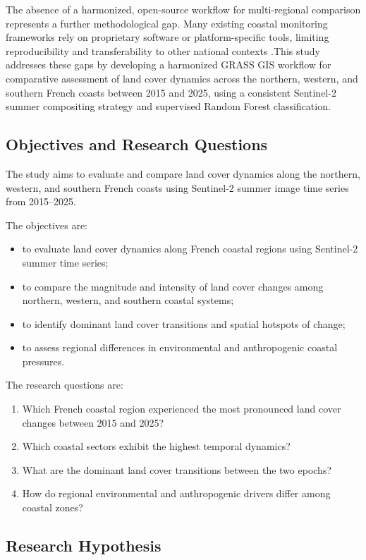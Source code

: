 \documentclass[remotesensing,article,submit,pdftex,moreauthors]{Definitions/mdpi}
\begin{document}
The absence of a harmonized, open-source workflow for multi-regional comparison represents a further methodological gap. Many existing coastal monitoring frameworks rely on proprietary software or platform-specific tools, limiting reproducibility and transferability to other national contexts \citep{camara2020open,ferreira2021reproducible,Lemenkova2023GRASS}.This study addresses these gaps by developing a harmonized GRASS GIS workflow for comparative assessment of land cover dynamics across the northern, western, and southern French coasts between 2015 and 2025, using a consistent Sentinel-2 summer compositing strategy and supervised Random Forest classification.

\subsection{Objectives and Research Questions}

The study aims to evaluate and compare land cover dynamics along the northern, western, and southern French coasts using Sentinel-2 summer image time series from 2015–2025. 

The objectives are:
\begin{itemize}
\item to evaluate land cover dynamics along French coastal regions using Sentinel-2 summer time series;
\item to compare the magnitude and intensity of land cover changes among northern, western, and southern coastal systems;
\item to identify dominant land cover transitions and spatial hotspots of change;
\item to assess regional differences in environmental and anthropogenic coastal pressures.
\end{itemize}

The research questions are:
\begin{enumerate}
\item Which French coastal region experienced the most pronounced land cover changes between 2015 and 2025?
\item Which coastal sectors exhibit the highest temporal dynamics?
\item What are the dominant land cover transitions between the two epochs?
\item How do regional environmental and anthropogenic drivers differ among coastal zones?
\end{enumerate}

\subsection{Research Hypothesis}
\end{document}
